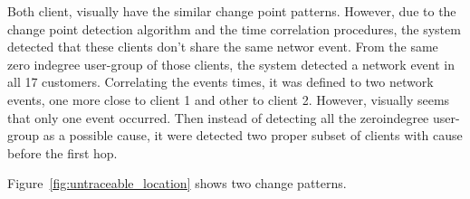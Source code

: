 Both client, visually have the similar change point patterns. However, due to
the change point detection algorithm and the time correlation procedures, the
system detected that these clients don't share the same networ event. From the
same zero indegree user-group of those clients, the system detected a network
event in all 17 customers. Correlating the events times, it was defined to two
network events, one more close to client 1 and other to client 2. However,
visually seems that only one event occurred. Then instead of detecting all the
zeroindegree user-group as a possible cause, it were detected two proper subset
of clients with cause before the first hop.

Figure~\ref{fig:untraceable_location} shows two change patterns.

\begin{figure}[H]
    \centering
\end{figure}
